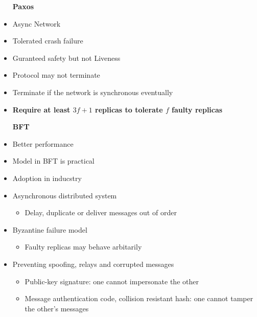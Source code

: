 \documentclass{easyclass}
\begin{document}
\begin{prf}{}
    \begin{minipage}[t]{0.45\linewidth}
        \centering
        \begin{itemize}
            \item [\textbf{Paxos}]
            \item Async Network
            \item Tolerated crash failure
            \item Guranteed safety but not Liveness
            \item Protocol may not terminate
            \item Terminate if the network is synchronous eventually
            \item \textbf{Require at least $3f+1$ replicas to tolerate $f$ faulty replicas}
        \end{itemize}
        \end{minipage}
        \hspace{0.5cm}
        \begin{minipage}[t]{0.45\linewidth}
            \begin{itemize}
                \item [\textbf{BFT}]
                \item Better performance
                \item Model in BFT is practical
                \item Adoption in inducstry
            \end{itemize}
        \centering
    \end{minipage}
\end{prf}
\newpage
\begin{theo}{}
    \begin{itemize}
        \item Asynchronous distributed system
                \begin{itemize}
                    \item Delay, duplicate or deliver messages out of order
                \end{itemize}
                \item Byzantine failure model
                 \begin{itemize}
                    \item Faulty replicas may behave arbitarily
                \end{itemize}
                \item Preventing spoofing, relays and corrupted messages
                \begin{itemize}
                    \item Public-key signature: one cannot impersonate the other
                    \item Message authentication code, collision resistant hash: one cannot tamper
                    the other's messages
                \end{itemize}
    \end{itemize}
\end{theo}
\end{document}
